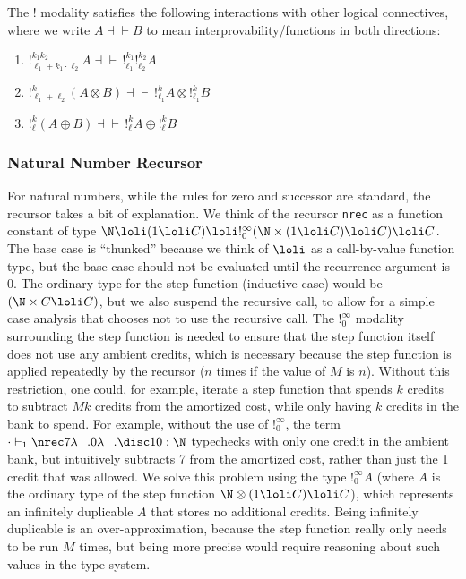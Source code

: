 The $!$ modality satisfies the following interactions with other logical
connectives, where we write $A \dashv \vdash B$ to mean
interprovability/functions in both directions:

\begin{theorem}\hfill
\label{thm:fusion}
\begin{enumerate}
  \item $!^{k_1k_2}_{\ell_1 + k_1 \cdot \ell_2} A \dashv \vdash \, !^{k_1}_{\ell_1} !^{k_2}_{\ell_2} A$
  \item $!^k_{\ell_1 + \ell_2} (A \otimes B) \dashv \vdash \, !^k_{\ell_1} A \otimes !^k_{\ell_1} B$
  \item $!^k_\ell (A \oplus B) \dashv \vdash \, !^k_\ell A \oplus !^k_\ell B$
\end{enumerate}
\end{theorem}

\subsubsection{Natural Number Recursor} \label{sec:ns-rules}

For natural numbers, while the rules for zero and successor are standard,
the recursor takes a bit of explanation.  We think of
the recursor \texttt{nrec} as a function constant of type
$\N \loli (1 \loli C) \loli !^\infty_0(\N \times (1 \loli C) \loli C) 
 \loli C$.
The base case is ``thunked'' because we think of $\loli$ as
a call-by-value function type, but the base case should not be evaluated until the recurrence
argument is~$0$.  The ordinary type for the step function (inductive case)
would be $(\N \times C \loli C)$, but we also suspend the recursive
call, to allow for a simple case analysis that chooses not to use the
recursive call.  
The $!^\infty_0$ modality surrounding the step function is needed to
ensure that the step function itself does not use any ambient credits,
which is necessary because the step function is applied repeatedly by
the recursor ($n$ times if the value of $M$ is $n$).  Without this
restriction, one could, for example, iterate a step function that spends
$k$ credits to subtract $Mk$ credits from the amortized cost, while only
having $k$ credits in the bank to spend.  For example, without the use of $!^\infty_0$, the term
$\cdot\vdash_1\nrec 7 {\lambda\_.0}{\lambda\_.\disc 1 0} : \N$ typechecks
with only one credit in the ambient bank, but 
intuitively subtracts 7 from the amortized cost, rather than just the
1 credit that was allowed.  
We solve this problem using the type $!^\infty_0 A$ (where $A$ is the ordinary
type of the step function $\N \otimes (1 \loli C) \loli C$),
which represents an infinitely duplicable $A$ that stores no additional credits.
Being infinitely duplicable is an over-approximation, because
the step function really only needs to be run $M$ times, but
being more precise would require reasoning about such values in the
type system.


